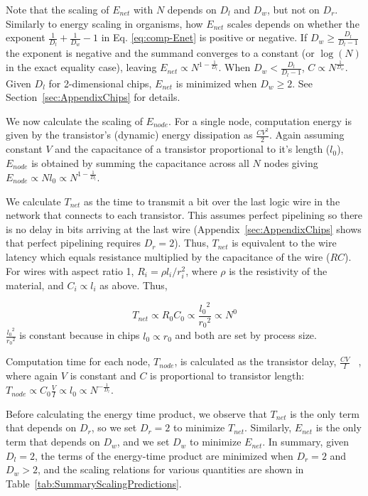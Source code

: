 \documentclass[12pt]{article}
\begin{document}
\noindent Note that the scaling of $E_{net} $ with $N$ depends on $D_l$ and
$D_w$, but not on $D_r$. Similarly to energy scaling in
organisms, how $E_{net}$ scales depends on whether the exponent
$\frac{1}{D_l} + \frac{1}{D_w}-1$ in Eq. \ref {eq:comp-Enet} is positive or
negative.  If $D_w \geq \frac{D_l}{D_l -1}$ the exponent is negative and the
summand converges to a constant (or $\log(N)$ in the exact equality case),
leaving $E_{net} \propto N^{1-\frac{1}{D_l}}$. When $D_w < \frac{D_l}{D_l -1}$,
$C \propto N^{\frac{1}{D_w}}$. Given $D_l$ for 2-dimensional chips, $E_{net}$
is minimized when $D_w \geq 2$. See Section~\ref{sec:AppendixChips} for
details.

We now calculate the scaling of $E_{node}$. 
For a single node, computation
energy is given by the transistor's (dynamic) energy dissipation as
$\frac{CV^2}{2}$. Again assuming constant $V$ and the capacitance of a
transistor proportional to it's length ($l_0$), $E_{node}$ is obtained
by summing
the capacitance across all $N$ nodes giving $E_{node} \propto N l_0  \propto
N^{1-\frac{1}{D_l}}$. 

We calculate $T_{net}$ as the time to transmit a bit over the last logic wire
in the network that connects to each transistor. This assumes perfect
pipelining so there is no delay in bits arriving at the last wire
(Appendix~\ref{sec:AppendixChips} shows that perfect pipelining requires $D_r =
2$). Thus, $T_{net}$ is equivalent to the wire latency which equals resistance
multiplied by the capacitance of the wire ($RC$). For wires with aspect ratio
1, $R_i = \rho l_i /r_i^2$, where $\rho$ is the resistivity of the material,
and $C_i \propto l_i$ as above.  Thus, 

\begin{equation}
\label{eq:comp-Tnet}
T_{net} \propto R_0C_0 \propto
\frac{{l_0}^2}{{r_0}^2} \propto N^0
\end {equation}
\noindent $ \frac{{l_0}^2}{{r_0}^2}$ is constant
because in chips  $l_0 \propto r_0$ and both are set by process size.

Computation time for each node, $T_{node}$, is calculated as the transistor
delay, $\frac{CV}{I}$ ~\cite{bakoglu90}, where again $V$ is constant and $C$ is
proportional to transistor length: $T_{node} \propto C_0 \frac{V}{I}  \propto
l_0  \propto N^{-\frac{1}{D_l}}$. 

Before calculating the energy time product, we observe that $T_{net}$ is the
only term that depends on $D_r$, so we set  $D_r = 2$ to minimize
$T_{net}$. Similarly, $E_{net}$ is the only term that depends on  $D_w$, and we
set $D_w$ to minimize $E_{net}$.  In summary, given $D_l = 2$, the terms of the energy-time product are minimized
when $D_r = 2$ and $D_w > 2$, and the scaling relations for various
quantities are shown in Table~\ref{tab:SummaryScalingPredictions}.
\end{document}
